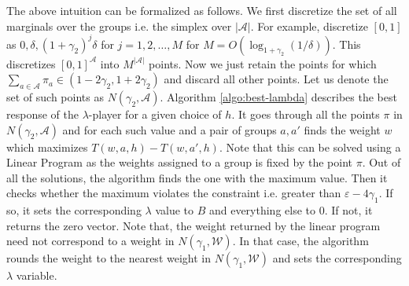\documentclass{article}
\newcommand{\set}[1]{\{#1\}}
\newcommand{\bbR}{\mathbb{R}}
\newcommand{\WW}{\mathcal{W}}
\newcommand{\abs}[1]{\left|#1\right|}
\newcommand{\Ac}{\mathcal{A}}
\newcommand{\eps}{\varepsilon}
\begin{document}
The above intuition can be formalized as follows.
%
We first discretize the set of all marginals over the groups i.e. the simplex over $\abs{\Ac}$.
For example, discretize $[0,1]$ as $0,\delta, (1+\gamma_2)^j \delta$ for $j=1,2,\ldots,M$ for $M = O(\log_{1+\gamma_2}(1/\delta))$. This discretizes $[0,1]^{\Ac}$ into $M^{\abs{\Ac} }$ points. Now we just retain the points for which $\sum_{a\in \Ac} \pi_a \in (1-2\gamma_2,1+2\gamma_2)$ and discard all other points. Let us denote the set of such points as $N(\gamma_2,\Ac)$. Algorithm \ref{algo:best-lambda} describes the best response of the $\lambda$-player for a given choice of $h$. It goes through all the points $\pi$ in $N(\gamma_2,\Ac)$ and for each such value and a pair of groups $a,a'$ finds the weight $w$ which maximizes $T(w,a,h) - T(w,a',h)$. Note that this can be solved using a Linear Program as the weights assigned to a group is fixed by the point $\pi$. Out of all the solutions, the algorithm finds the one with the maximum value. Then it checks whether the maximum violates the constraint i.e. greater than $\eps - 4\gamma_1$. If so, it sets the corresponding $\lambda$ value to $B$ and everything else to $0$. If not, it returns the zero vector. Note that, the weight returned by the linear program need not correspond to a weight in $N(\gamma_1, \WW)$. In that case, the algorithm rounds the weight to the nearest weight in $N(\gamma_1,\WW)$ and sets the corresponding $\lambda$ variable.
\end{document}
